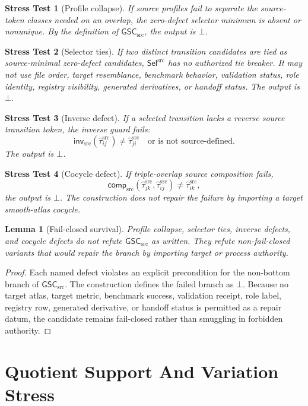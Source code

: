 \documentclass[11pt]{article}
\newcommand{\GSC}{\mathsf{GSC}_{\mathrm{src}}}
\newcommand{\Sel}{\mathsf{Sel}^{\mathrm{src}}}
\newcommand{\Tau}{\widehat{\tau}^{\mathrm{src}}}
\newcommand{\Bot}{\bot}
\newtheorem{stress}{Stress Test}
\newtheorem{lemma}{Lemma}
\begin{document}
\begin{stress}[Profile collapse]
If source profiles fail to separate the source-token classes needed on an
overlap, the zero-defect selector minimum is absent or nonunique. By the
definition of \(\GSC\), the output is \(\Bot\).
\end{stress}

\begin{stress}[Selector ties]
If two distinct transition candidates are tied as source-minimal zero-defect
candidates, \(\Sel\) has no authorized tie breaker. It may not use file
order, target resemblance, benchmark behavior, validation status, role
identity, registry visibility, generated derivatives, or handoff status. The
output is \(\Bot\).
\end{stress}

\begin{stress}[Inverse defect]
If a selected transition lacks a reverse source transition token, the inverse
guard fails:
\[
  \mathsf{inv}_{\mathrm{src}}(\Tau_{ij})\neq \Tau_{ji}
  \quad\text{or is not source-defined.}
\]
The output is \(\Bot\).
\end{stress}

\begin{stress}[Cocycle defect]
If triple-overlap source composition fails,
\[
  \mathsf{comp}_{\mathrm{src}}(\Tau_{jk},\Tau_{ij})\neq \Tau_{ik},
\]
the output is \(\Bot\). The construction does not repair the failure by
importing a target smooth-atlas cocycle.
\end{stress}

\begin{lemma}[Fail-closed survival]
Profile collapse, selector ties, inverse defects, and cocycle defects do not
refute \(\GSC\) as written. They refute non-fail-closed variants that would
repair the branch by importing target or process authority.
\end{lemma}

\begin{proof}
Each named defect violates an explicit precondition for the non-bottom branch
of \(\GSC\). The construction defines the failed branch as \(\Bot\). Because
no target atlas, target metric, benchmark success, validation receipt, role
label, registry row, generated derivative, or handoff status is permitted as
a repair datum, the candidate remains fail-closed rather than smuggling in
forbidden authority.
\end{proof}

\section{Quotient Support And Variation Stress}
\end{document}
